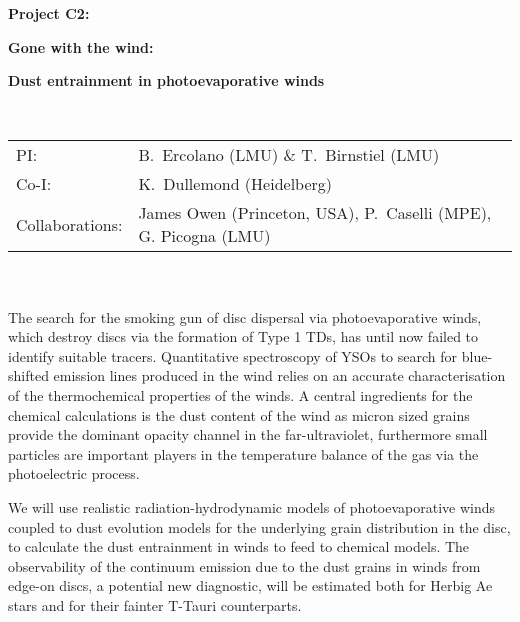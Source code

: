 \documentclass[10pt,fleqn,twoside]{article}
\newcommand{\Tcol}{\color{blue}}
\begin{document}
\newpage


\setcounter{page}{1}

\centerline{\huge\bf\Tcol
%
%
%
%
%
 Project C2:}

\centerline{\huge\bf\Tcol Gone with the wind:}
\centerline{\huge\bf\Tcol Dust entrainment in photoevaporative winds}

%
%
%
%
%
\vskip1.0cm


\\
\begin{tabular}{ll}
{\textsf{PI:}}                   & B.~Ercolano (LMU) \& T.~Birnstiel (LMU)\\
{\textsf{Co-I:}}                & K.~Dullemond (Heidelberg)\\
{\textsf{Collaborations:}}      &  James Owen (Princeton, USA), P.~Caselli (MPE), G. Picogna (LMU)\\

\end{tabular}


\vspace{1em}
 \\

\vspace{1em}
\\

The search for the smoking gun of disc dispersal via photoevaporative
winds, which destroy discs via the formation of Type 1 TDs,  has until
now failed to identify suitable tracers. Quantitative spectroscopy of
YSOs to search for blue-shifted emission lines produced in the wind
relies on an accurate characterisation of the thermochemical
properties of the winds. A central ingredients for the chemical
calculations is the dust content of the wind as micron sized grains
provide the dominant opacity channel in the far-ultraviolet,
furthermore small particles are important players in the temperature
balance of the gas via the photoelectric process.  

We will use realistic radiation-hydrodynamic models of
photoevaporative winds coupled to dust evolution models for the
underlying grain distribution in the disc, to calculate the dust
entrainment in winds to feed to chemical models. The observability of
the continuum emission due to the dust grains in winds from edge-on
discs, a potential new diagnostic, will be estimated both for Herbig
Ae stars and for their fainter T-Tauri counterparts.  
\end{document}
